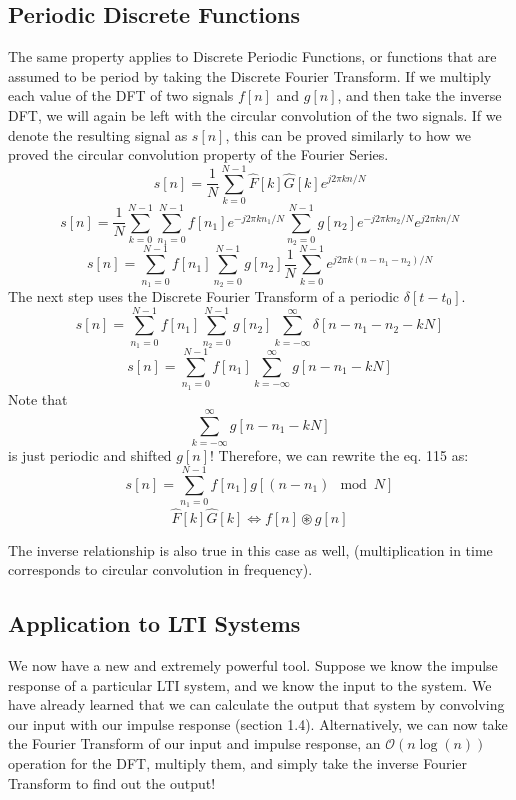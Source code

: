 \documentclass[a4paper]{article}
\numberwithin{equation}{section}
\begin{document}
\subsection{Periodic Discrete Functions}
The same property applies to Discrete Periodic Functions, or functions that are assumed to be period by taking the Discrete Fourier Transform. If we multiply each value of the DFT of two signals $f[n]$ and $g[n]$, and then take the inverse DFT, we will again be left with the circular convolution of the two signals. If we denote the resulting signal as $s[n]$, this can be proved similarly to how we proved the circular convolution property of the Fourier Series. 
\begin{equation}
s[n]=\frac{1}{N}\sum_{k=0}^{N-1}\hat{F}[k]\hat{G}[k]e^{j2\pi kn/N}
\end{equation}
\begin{equation}
s[n]=\frac{1}{N}\sum_{k=0}^{N-1}\sum_{n_1=0}^{N-1}f[n_1]e^{-j2\pi k n_1/N}\sum_{n_2=0}^{N-1}g[n_2]e^{-j2\pi k n_2/N}e^{j2\pi kn/N}
\end{equation}
\begin{equation}
s[n]=\sum_{n_1=0}^{N-1}f[n_1]\sum_{n_2=0}^{N-1}g[n_2]\frac{1}{N}\sum_{k=0}^{N-1}e^{j2\pi k(n-n_1-n_2)/N}
\end{equation}
The next step uses the Discrete Fourier Transform of a periodic $\delta[t-t_0]$. 
\begin{equation}
s[n]=\sum_{n_1=0}^{N-1}f[n_1]\sum_{n_2=0}^{N-1}g[n_2]\sum_{k=-\infty}^{\infty}\delta[n-n_1-n_2-kN]
\end{equation}
\begin{equation}
s[n]=\sum_{n_1=0}^{N-1}f[n_1]\sum_{k=-\infty}^{\infty}g[n-n_1-kN]
\end{equation}
Note that 
\begin{equation}
\sum_{k=-\infty}^{\infty}g[n-n_1-kN]
\end{equation}
is just periodic and shifted $g[n]$! Therefore, we can rewrite the eq. 115 as:
\begin{equation}
s[n]=\sum_{n_1=0}^{N-1}f[n_1]g[(n-n_1)\mod N]
\end{equation}
\begin{equation}
\boxed{
\hat{F}[k]\hat{G}[k]\Longleftrightarrow f[n]\circledast g[n]}
\end{equation}

The inverse relationship is also true in this case as well, (multiplication in time corresponds to circular convolution in frequency). 

\subsection{Application to LTI Systems}
We now have a new and extremely powerful tool. Suppose we know the impulse response of a particular LTI system, and we know the input to the system. We have already learned that we can calculate the output that system by convolving our input with our impulse response (section 1.4). Alternatively, we can now take the Fourier Transform of our input and impulse response, an $\mathcal{O}(n\log(n))$ operation for the DFT, multiply them, and simply take the inverse Fourier Transform to find out the output! \\
\end{document}
